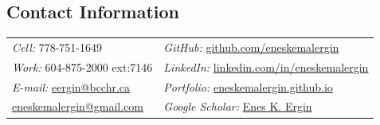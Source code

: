 \documentclass[margin,line]{res}
\begin{document}

\begin{resume}

\section{\sc Contact Information}
\vspace{.05in}
\begin{tabular}{@{}p{2.3in}p{3.45in}}
{\it Cell:} 778-751-1649                                                               & \hfill {\it GitHub:}  \href{https://github.com/eneskemalergin}{github.com/eneskemalergin} \\
{\it Work:} 604-875-2000 ext:7146                                                      & \hfill {\it LinkedIn:}  \href{https://www.linkedin.com/in/eneskemalergin/}{linkedin.com/in/eneskemalergin} \\
{\it E-mail:}  \href{mailto:eergin@bcchr.ca}{eergin@bcchr.ca}                         & \hfill {\it Portfolio:}  \href{https://eneskemalergin.github.io}{eneskemalergin.github.io} \\
\hspace{3.65em}\href{mailto:eneskemalergin@gmail.com}{eneskemalergin@gmail.com}        & \hfill {\it Google Scholar:}  \href{https://scholar.google.com/citations?user=6iZzHecAAAAJ&hl=en}{Enes K. Ergin} \\
\end{tabular}




\end{resume}
\end{document}
